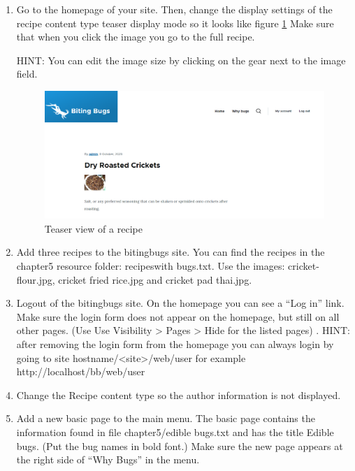\begin{enumerate}
   \item Go to the homepage of your site. Then, change the display settings of the recipe content type teaser display mode so it looks like figure \ref{fig:bb_recipe_teaser} Make sure that when you click the image you go to the full recipe.
    
    HINT: You can edit the image size by clicking on the gear next to the image field.
    
       \begin{figure}[h]
       \centering
       \includegraphics[width=1\linewidth]{img/ch5/bb_recipe_teaser}
       \caption{Teaser view of a recipe}
       \label{fig:bb_recipe_teaser}
   \end{figure} 
    
   \item Add three recipes to the bitingbugs site. You can find the recipes in the chapter5 resource folder: recipes\textunderscore with \textunderscore bugs.txt. Use the images: cricket-flour.jpg, cricket \textunderscore fried \textunderscore rice.jpg and cricket \textunderscore pad \textunderscore thai.jpg.
   
   \item	Logout of the bitingbugs site. On the homepage you can see a “Log in” link. Make sure the login form does not appear on the homepage, but still on all other pages. (Use Use Visibility > Pages > Hide for the listed pages) . 
    HINT: after removing the login form from the homepage you can always login by going to site hostname/<site>/web/user for example http://localhost/bb/web/user
    
    \item	Change the Recipe content type so the author information is not displayed.
    
    \item	Add a new basic page to the main menu. The basic page contains the information found in file chapter5/edible \textunderscore bugs.txt and has the title Edible bugs. (Put the bug names in bold font.) Make sure the new page appears at the right side of “Why Bugs” in the menu.
\end{enumerate}
